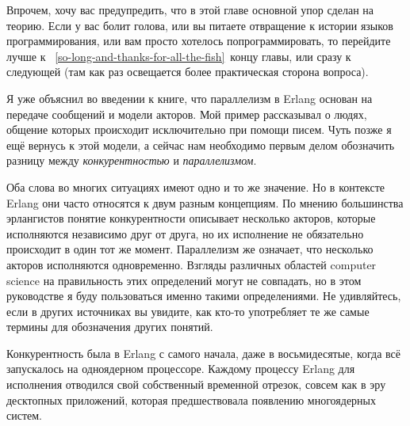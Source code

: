 Впрочем, хочу вас предупредить, что в этой главе основной упор сделан на теорию.
Если у вас болит голова, или вы питаете отвращение к истории языков программирования, или вам просто хотелось попрограммировать, то перейдите лучше к ~\ref{so-long-and-thanks-for-all-the-fish}~концу главы, или сразу к следующей (там как раз освещается более практическая сторона вопроса).

Я уже объяснил во введении к книге, что параллелизм в Erlang основан на передаче сообщений и модели акторов.
Мой пример рассказывал о людях, общение которых происходит исключительно при помощи писем.
Чуть позже я ещё вернусь к этой модели, а сейчас нам необходимо первым делом обозначить разницу между \emph{конкурентностью} и \emph{параллелизмом}.

Оба слова во многих ситуациях имеют одно и то же значение.
Но в контексте Erlang они часто относятся к двум разным концепциям.
По мнению большинства эрлангистов понятие конкурентности описывает несколько акторов, которые исполняются независимо друг от друга, но их исполнение не обязательно происходит в один тот же момент.
Параллелизм же означает, что несколько акторов исполняются одновременно.
Взгляды различных областей computer science на правильность этих определений могут не совпадать, но в этом руководстве я буду пользоваться именно такими определениями.
Не удивляйтесь, если в других источниках вы увидите, как кто\--то употребляет те же самые термины для обозначения других понятий.

Конкурентность была в Erlang с самого начала, даже в восьмидесятые, когда всё запускалось на одноядерном процессоре.
Каждому процессу Erlang для исполнения отводился свой собственный временной отрезок, совсем как в эру десктопных приложений, которая предшествовала появлению многоядерных систем.

